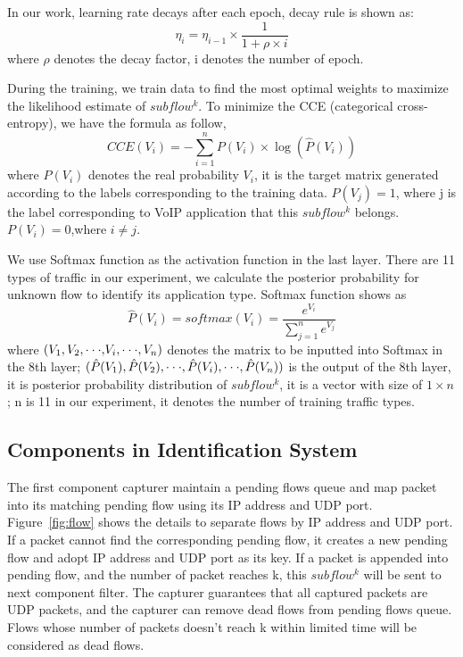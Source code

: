 \documentclass[conference]{IEEEtran}
\begin{document}
In our work, learning rate decays after each epoch, decay rule is shown as:
\begin{equation}
{\eta _i} = {\eta _{i - 1}} \times \frac{1}{{1 + \rho  \times i}}
\end{equation}
where ${\rho }$ denotes the decay factor, i denotes the number of epoch.

During the training, we train data to find the most optimal weights to maximize the likelihood estimate of $subflow^k$. To minimize the CCE (categorical cross-entropy), we have the formula as follow,
\begin{equation}
CCE({V_i}) =  - \sum\limits_{i = 1}^n {P({V_i}) \times \log (\hat P({V_i}))}
\end{equation}
where $P({V_i})$ denotes the real probability ${V_i}$, it is the target matrix generated according to the labels corresponding to the training data. $P({V_j})=1$, where j is the label corresponding to VoIP application that this $subflow^k$ belongs.$P({V_i})=0$,where $i \ne j$.

We use Softmax function as the activation function in the last layer. There are 11 types of traffic in our experiment, we calculate the posterior probability for unknown flow to identify its application type. Softmax function shows as
\begin{equation}
\hat P({V_i}) = softmax({V_i}) = \frac{{{e^{{V_i}}}}}{{\sum\limits_{j = 1}^n {{e^{{V_j}}}} }}
\end{equation}
where $({V_1},{V_2},{\rm{\cdot\cdot\cdot,}}{V_i},{\rm{\cdot\cdot\cdot}},{V_n})$ denotes the matrix to be inputted into Softmax in the 8th layer; $(\hat P({V_1}),\hat P({V_2}),{\rm{\cdot\cdot\cdot}},\hat P({V_i}),{\rm{\cdot\cdot\cdot}},\hat P({V_n}))$ is the output of the 8th layer, it is posterior probability distribution of $subflow^k$, it is a vector with size of $1 \times n$; n is 11 in our experiment, it denotes the number of training traffic types.

\subsection{Components in Identification System}

The first component capturer maintain a pending flows queue and map packet into its matching pending flow using its IP address and UDP port. Figure~\ref{fig:flow} shows the details to separate flows by IP address and UDP port. If a packet cannot find the corresponding pending flow, it creates a new pending flow and adopt IP address and UDP port as its key. If a packet is appended into pending flow, and the number of packet reaches k, this $subflow^k$ will be sent to next component filter. The capturer guarantees that all captured packets are UDP packets, and the capturer can remove dead flows from pending flows queue. Flows whose number of packets doesn't reach k within limited time will be considered as dead flows.
\end{document}
